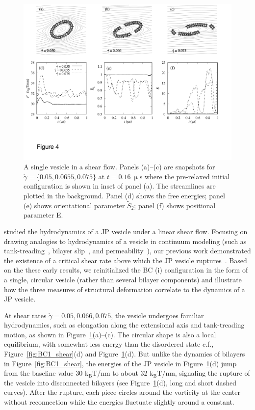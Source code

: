 \documentclass[prb,preprint,showpacs,preprintnumbers,amsmath,amssymb,longbibliography]{revtex4-1}
\begin{document}
\begin{figure}
  \begin{center}
    \includegraphics[width=1.0\textwidth]{Figures/Figure4.pdf}
  \end{center}
  \caption{
    \label{fig:Ves_shear}
A single vesicle in a shear flow. Panels (a)--(c) are snapshots for
  $\dot \gamma = \{0.05, 0.0655, 0.075\}$ at $t=0.16\ \upmu$s where the
  pre-relaxed initial configuration is shown in inset of panel (a). The
  streamlines are plotted in the background. Panel (d) shows the free
  energies; panel (e) shows orientational parameter $\tilde{S}_2$; panel
  (f) shows positional parameter E.}
\end{figure}
\citet{Fu2022_JFM} studied the hydrodynamics of a JP vesicle under a
linear shear flow. Focusing on drawing analogies to hydrodynamics of a
vesicle in continuum modeling (such as
tank-treading~\cite{keller_skalak_1982,Finken08,Shaqfeh11}, bilayer
slip~\cite{sch-vla-mik2010,denOtter2007,Zgorski2019}, and
permeability~\cite{chabanon2017, qua-gan-you2021}), our previous work
demonstrated the existence of a critical shear rate above which the JP vesicle
ruptures~\cite{grandmaison_brancherie_salsac_2021,D2SM00179A}. Based on
the these early results, we reinitialized the BC (i) configuration in
the form of a single, circular vesicle (rather than several bilayer
components) and illustrate how the three measures of structural
deformation correlate to the dynamics of a JP vesicle.

At shear rates $\dot\gamma=0.05, 0.066, 0.075$, the vesicle undergoes
familiar hydrodynamics, such as elongation along the extensional axis
and tank-treading motion, as shown in
Figure~\ref{fig:Ves_shear}(a)--(c).
%
The circular shape is also a local equilibrium, with somewhat less
energy than the disordered state c.f., Figure~\ref{fig:BC1_shear}(d) and
Figure~\ref{fig:Ves_shear}(d). But unlike the dynamics of bilayers in
Figure~\ref{fig:BC1_shear}, the energies of the JP vesicle in
Figure~\ref{fig:Ves_shear}(d) jump from the baseline value 30
$\mathrm{k_BT}$/nm to about 32 $\mathrm{k_BT}$/nm, signaling the rupture
of the vesicle into disconnected bilayers (see
Figure~\ref{fig:Ves_shear}(d), long and short dashed curves).  After the
rupture, each piece circles around the vorticity at the center without
reconnection while the energies fluctuate slightly around a constant.
\end{document}

